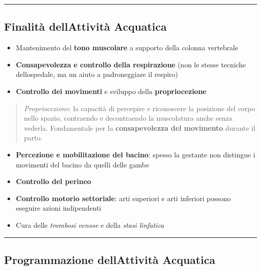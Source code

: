 \documentclass[a4paper,11pt]{article}
\providecommand{\tightlist}{%
  \setlength{\itemsep}{0pt}\setlength{\parskip}{0pt}}
\begin{document}
\begin{center}\rule{0.5\linewidth}{0.5pt}\end{center}

\subsection{Finalità dell\textquotesingle Attività
      Acquatica}\label{finalituxe0-dellattivituxe0-acquatica}

\begin{itemize}
      \tightlist
      \item
            Mantenimento del \textbf{tono muscolare} a supporto della colonna
            vertebrale
      \item
            \textbf{Consapevolezza e controllo della respirazione} (non le stesse
            tecniche dell\textquotesingle ospedale, ma un aiuto a padroneggiare il
            respiro)
      \item
            \textbf{Controllo dei movimenti} e sviluppo della
            \textbf{propriocezione}
\end{itemize}

\begin{quote}
      \emph{Propriocezione}: la capacità di percepire e riconoscere la
      posizione del corpo nello spazio, contraendo e decontraendo la
      muscolatura anche senza vederla. Fondamentale per la
      \textbf{consapevolezza del movimento} durante il parto.
\end{quote}

\begin{itemize}
      \tightlist
      \item
            \textbf{Percezione e mobilitazione del bacino}: spesso la gestante non
            distingue i movimenti del bacino da quelli delle gambe
      \item
            \textbf{Controllo del perineo}
      \item
            \textbf{Controllo motorio settoriale}: arti superiori e arti inferiori
            possono eseguire azioni indipendenti
      \item
            Cura delle \emph{trombosi venose} e della \emph{stasi linfatica}
\end{itemize}

\begin{center}\rule{0.5\linewidth}{0.5pt}\end{center}

\subsection{Programmazione dell\textquotesingle Attività
      Acquatica}\label{programmazione-dellattivituxe0-acquatica}
\end{document}
